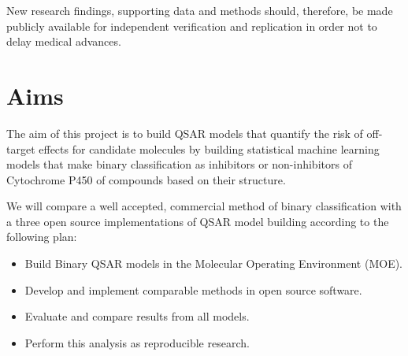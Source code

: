 New research findings, supporting data and methods should, therefore, be made publicly available for independent verification and replication in order not to delay medical advances.



\section{Aims}
The aim of this project is to build QSAR models that quantify the risk of off-target effects for candidate molecules by building statistical machine learning models that make binary classification as inhibitors or non-inhibitors of Cytochrome P450 of compounds based on their structure.

We will compare a well accepted, commercial method of binary classification with a three open source implementations of QSAR model building according to the following plan:

\begin{itemize}

\item Build Binary QSAR models in the Molecular Operating Environment (MOE).

\item Develop and implement comparable methods in open source software.

\item Evaluate and compare results from all models.

\item Perform this analysis as reproducible research.

\end{itemize}
